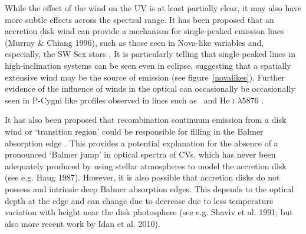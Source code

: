 \documentclass[preprint, a4paper, 11pt]{aastex}
\begin{document}
While the effect of the wind on the UV is at least partially clear, it may also have more subtle 
effects across the spectral range. It has been proposed that an accretion disk wind
can provide a mechanism for single-peaked emission lines (Murray \& Chiang 1996), 
such as those seen in Nova-like variables and, especially, the SW Sex stars \citep{HSK86, DR95}.
It is particularly telling that single-peaked 
lines in high-inclination systems can be seen even in eclipse, suggesting 
that a spatially extensive wind may be the source of emission (see figure~\ref{novalikes}).
Further evidence of the influence of winds in the optical can occasionally 
be occasionally seen in P-Cygni like profiles observed in lines such as \ha\ 
and He \textsc{i} $\lambda5876$ \citep{RN98}.


It has also been proposed
that recombination continuum emission from a disk wind or `transition region'
could be responsible for filling in the Balmer absorption edge  \citep{KLWB98}. 
This provides a potential explanation for
the absence of a pronounced `Balmer jump' in optical spectra of CVs, 
which has never been adequately produced by using stellar atmospheres 
to model the accretion disk (see e.g. Haug 1987)\nocite{haug1987}. 
However, it is also possible that accretion disks do not possess
and intrinsic deep Balmer absorption edges.
This depends to the optical depth at the edge
and can change due to decrease due to less temperature variation with height
near the disk photosphere (see e.g. Shaviv et al. 1991; 
but also more recent work by Idan et al. 2010).
\nocite{idanshaviv2010} \nocite{shaviv1991}
\end{document}

